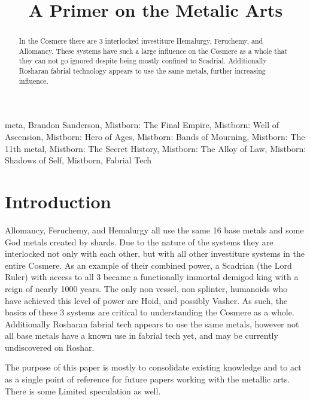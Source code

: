 \documentclass[conference]{IEEEtran}
\begin{document}
\title{A Primer on the Metalic Arts}

\author{
}

\maketitle

\begin{abstract}
In the Cosmere there are 3 interlocked investiture Hemalurgy, Feruchemy, and Allomancy.  These systems have such a large influence on the Cosmere as a whole that they can not go ignored despite being mostly confined to Scadrial.  Additionally Rosharan fabrial technology appears to use the same metals, further increasing influence.
\end{abstract}

\begin{IEEEkeywords}
meta, Brandon Sanderson, Mistborn: The Final Empire, Mistborn: Well of Ascension, Mistborn: Hero of Ages, Mistborn: Bands of Mourning, Mistborn: The 11th metal, Mistborn: The Secret History, Mistborn: The Alloy of Law, Mistborn: Shadows of Self, Mistborn, Fabrial Tech
\end{IEEEkeywords}

\section*{Introduction}
Allomancy, Feruchemy, and Hemalurgy all use the same 16 base metals and some God metals created by shards\cite{ARS}. Due to the nature of the systems they are interlocked not only with each other, but with all other investiture systems in the entire Cosmere.  As an example of their combined power, a Scadrian (the Lord Ruler) with access to all 3 became a functionally immortal demigod king with a reign of nearly 1000 years.  The only non vessel, non splinter, humanoids who have achieved this level of power are Hoid, and possibly Vasher.  As such, the basics of these 3 systems are critical to understanding the Cosmere as a whole.  Additionally Rosharan fabrial tech appears to use the same metals, however not all base metals have a known use in fabrial tech yet, and may be currently undiscovered on Roshar. 

The purpose of this paper is mostly to consolidate existing knowledge and to act as a single point of reference for future papers working with the metallic arts.  There is some Limited speculation as well.
\end{document}
